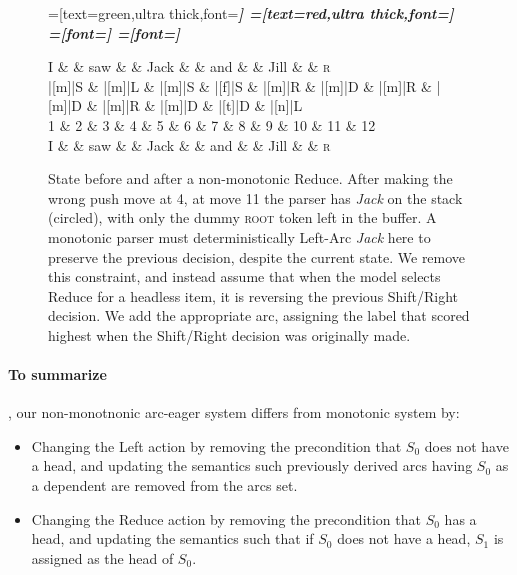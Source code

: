 \documentclass[11pt,letterpaper]{article}
\begin{document}
\begin{figure}
    \centering
    \begin{dependency}[theme=simple]
    =[text=green,ultra thick,font=\bfseries\itshape]
    =[text=red,ultra thick,font=\bfseries\itshape]
    =[font=\bfseries\itshape]
    =[font=\itshape]
    \begin{deptext}[column sep=.075cm, row sep=.1ex]
        I \&           \& saw \&          \& Jack       \& \& and     \&           \& Jill \&   \& \textsc{r} \\
       |[m]|S \& |[m]|L \& |[m]|S   \& |[f]|S \& |[m]|R \& |[m]|D \& |[m]|R \& |[m]|D \& |[m]|R \& |[m]|D \& |[t]|D \& |[n]|L \\
            1 \&     2       \& 3  \&   4      \& 5          \& 6 \& 7     \& 8 \& 9 \& 10 \& 11 \& 12 \\
            I \&           \& saw \&          \& Jack       \& \& and     \&           \& Jill \& \& \textsc{r} \\
\end{deptext}
    
    
\end{dependency}
\caption{
\small
State before and after a non-monotonic Reduce.
After making the wrong push move at 4, at move 11
the parser has \emph{Jack} on the stack (circled), with only the dummy \textsc{root}
token left in the buffer. A monotonic parser must deterministically Left-Arc
\emph{Jack} here to preserve the previous decision, despite the current state.
We remove this constraint, and instead assume that when the model selects Reduce
for a headless item, it is reversing the previous Shift/Right decision. We add
the appropriate arc, assigning the label that scored highest when the Shift/Right
decision was originally made.
\label{fig:adduce}}
\end{figure}

\noindent\paragraph{To summarize}, our non-monotnonic arc-eager system differs from
monotonic system by:
\begin{itemize}
   \item Changing the Left action by removing the precondition that $S_0$
   does not have a head, and updating the semantics such previously
   derived arcs having $S_0$ as a dependent are removed from the arcs set.

   \item Changing the Reduce action by removing the precondition that $S_0$
   has a head, and updating the semantics such that if $S_0$ does not have
   a head, $S_1$ is assigned as the head of $S_0$.
\end{itemize}
\end{document}
